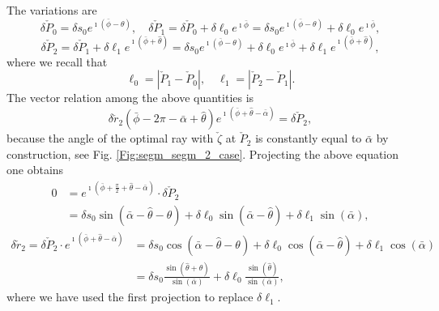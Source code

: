 \documentclass[reqno]{amsart}
\theoremstyle{definition} \newtheorem{definition}{Definition}[section]
\theoremstyle{definition} \newtheorem{remark}[definition]{Remark}
\theoremstyle{plain} \newtheorem{lemma}[definition]{Lemma}
\theoremstyle{plain} \newtheorem{proposition}[definition]{Proposition}
\theoremstyle{plain} \newtheorem{theorem}[definition]{Theorem}
\theoremstyle{plain} \newtheorem{corollary}[definition]{Corollary}
\theoremstyle{definition} \newtheorem{example}[definition]{Example}
\theoremstyle{plain} \newtheorem{claim}[clai]{Claim}
\theoremstyle{definition} \newtheorem{assumption}[definition]{Assumption}
\theoremstyle{definition} \newtheorem{observation}[definition]{Observation}
\newcommand{\1}{\mathbbm 1}
\renewcommand{\i}{\imath}
\numberwithin{equation}{section} %
\theoremstyle{plain} \newtheorem*{theorem*}{Theorem}
\theoremstyle{plain} \newtheorem{mthm}[maintheorem]{Main Theorem}
\theoremstyle{plain} \newtheorem*{mthm*}{Main Theorem}
\theoremstyle{plain} \newtheorem*{conjecture*}{Conjecture}
\theoremstyle{plain} \newtheorem{conjecture}[definition]{Conjecture}
\theoremstyle{plain} \newtheorem*{problem*}{Problem}
\begin{document}
The variations are
\begin{equation*}
\delta \check P_0 = \delta s_0 e^{\i (\bar \phi - \theta)}, \quad %
\delta \check P_1 = \delta \check P_0 + \delta \ell_0 e^{\i \bar \phi} = \delta s_0 e^{\i (\bar \phi - \theta)} + \delta \ell_0 e^{\i \bar \phi},
\end{equation*}
\begin{equation*}
\delta \check P_2 = \delta \check P_1 + \delta \ell_1 e^{\i (\bar \phi + \hat \theta)} = \delta s_0 e^{\i (\bar \phi - \theta)} + \delta \ell_0 e^{\i \bar \phi} + \delta \ell_1 e^{\i (\bar \phi + \hat \theta)},
\end{equation*}
where we recall that
\begin{equation*}
\ell_0 = |\check P_1 - \check P_0|, \quad \ell_1 = |\check P_2 - \check P_1|.
\end{equation*}
The vector relation among the above quantities is
\begin{equation*}
\delta \check r_2(\bar \phi - 2\pi - \bar \alpha + \hat \theta) e^{\i (\bar \phi + \hat \theta - \bar \alpha)} = \delta \check P_2,
\end{equation*}
because the angle of the optimal ray with $\check \zeta$ at $\check P_2$ is constantly equal to $\bar\alpha$ by construction, see Fig. \ref{Fig:segm_segm_2_case}.
Projecting the above equation one obtains
\begin{align*}
0 &= e^{\i (\bar \phi + \frac{\pi}{2} + \hat \theta - \bar \alpha)} \cdot \delta \check P_2 \\
&= \delta s_0 \sin(\bar \alpha - \hat \theta - \theta) + \delta \ell_0 \sin(\bar \alpha - \hat \theta) + \delta \ell_1 \sin(\bar \alpha), 
\end{align*}
\begin{align*}
\delta \check r_2 = \delta \check P_2 \cdot e^{\i (\bar \phi + \hat \theta - \bar \alpha)} &= \delta s_0 \cos(\bar \alpha - \hat \theta - \theta) + \delta \ell_0 \cos(\bar \alpha - \hat \theta) + \delta \ell_1 \cos(\bar \alpha) \\
&= \delta s_0 \frac{\sin(\hat \theta + \theta)}{\sin(\bar \alpha)} + \delta \ell_0 \frac{\sin(\hat \theta)}{\sin(\bar \alpha)},
\end{align*}
where we have used the first projection to replace $\delta \ell_1$.
\end{document}
